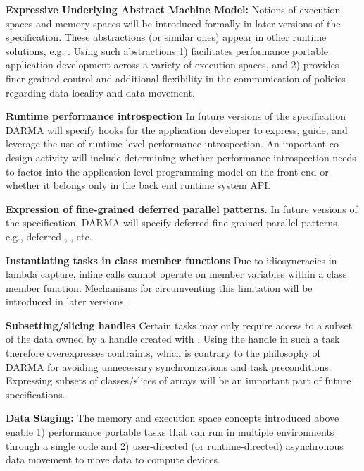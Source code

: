\begin{compactdesc}
\item{\bf Expressive Underlying Abstract Machine Model:}
Notions of \glspl{execution space} and \glspl{memory space} will be introduced
formally in later
versions of the specification.  These abstractions (or similar ones) appear in other runtime
solutions, e.g. \cite{Kokkos, RAJA}. 
   Using such abstractions 1) facilitates performance portable application development across 
  a variety of \glspl{execution space}, and 2)
  provides finer-grained control and additional flexibility in the
  communication of policies regarding data locality and data movement. 
\item{\bf Runtime performance introspection}
  In future versions of the specification \gls{DARMA} will specify hooks for the
  application developer to express, guide, and leverage the use of runtime-level
  performance \gls{introspection}. An important \gls{co-design} activity will include determining
  whether performance \gls{introspection} needs to factor into the
  application-level \gls{programming
  model} on the \gls{front end} or whether it belongs only in the \gls{back end} 
  \gls{runtime system} \gls{API}.
\item{\bf Expression of fine-grained deferred parallel patterns}.
  In future versions of the specification, \gls{DARMA} will 
  specify deferred fine-grained parallel patterns, e.g., deferred
  , , etc.
\item{\bf Instantiating tasks in class member functions}
  Due to idiosyncracies in \CC{} \gls{lambda} \gls{capture}, inline \cwork calls cannot operate on member variables
 within a class member function. 
 Mechanisms for circumventing this \CC{} limitation will be introduced in later versions.
\item{\bf Subsetting/slicing handles}
  Certain \glspl{task} may only require access to a subset of the data owned by
  a handle created with .
  Using the \gls{handle} in such a \gls{task} therefore overexpresses
  contraints, which is contrary to the philosophy of \gls{DARMA} for avoiding
  unnecessary synchronizations and \gls{task} \glspl{precondition}.
 Expressing subsets of classes/slices of arrays will be an important part of future specifications.
\item {\bf Data Staging:}
The memory and execution space concepts introduced above enable 1) performance portable tasks that can run in 
multiple environments through a single code and 2) user-directed (or runtime-directed) asynchronous data movement to move data to compute devices.

\end{compactdesc}
